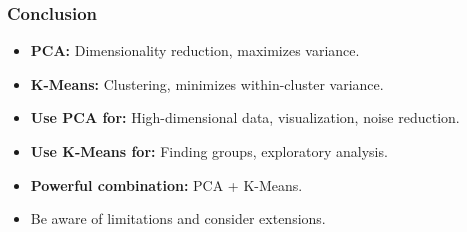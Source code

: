 \documentclass[aspectratio=169]{beamer}
\begin{document}
\begin{frame}
\frametitle{Conclusion}
\begin{itemize}
    \item \textbf{PCA:} Dimensionality reduction, maximizes variance.
    \item \textbf{K-Means:} Clustering, minimizes within-cluster variance.
    \item \textbf{Use PCA for:} High-dimensional data, visualization, noise reduction.
    \item \textbf{Use K-Means for:}  Finding groups, exploratory analysis.
    \item \textbf{Powerful combination:} PCA + K-Means.
    \item Be aware of limitations and consider extensions.
\end{itemize}
\end{frame}



\end{document}
